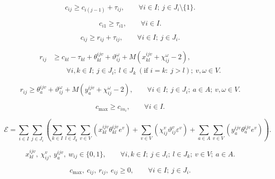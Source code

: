 \documentclass[11pt]{article}
\begin{document}
\begin{equation}
c_{ij} \ge c_{i(j-1)} + \tau_{ij},
\qquad \forall i \in I;\ j \in J_i\setminus\{1\}.
\tag{B7}
\end{equation}

\begin{equation}
c_{i1} \ge \tau_{i1},
\qquad \forall i \in I.
\tag{B8}
\end{equation}

\begin{equation}
c_{ij} \ge r_{ij} + \tau_{ij},
\qquad \forall i \in I;\ j \in J_i.
\tag{B9}
\end{equation}

\begin{equation}
\begin{aligned}
r_{ij}
&\ge
c_{kl}-\tau_{kl}
+
\theta_{kl}^{ijv}
+
\vartheta_{ij}^{\omega}
+
M\left(x_{kl}^{ijv}+\chi_{ij}^{\omega}-2\right),\\
&\qquad
\forall i,k \in I;\ j \in J_i;\ l \in J_k\ ( \text{if } i=k:\ j>l );
\ v,\omega \in V.
\end{aligned}
\tag{B10}
\end{equation}

\begin{equation}
r_{ij}
\ge
\theta_a^{ijv}
+
\vartheta_{ij}^{\omega}
+
M\left(y_a^{ijv}+\chi_{ij}^{\omega}-2\right),
\qquad
\forall i \in I;\ j \in J_i;\ a \in A;\ v,\omega \in V.
\tag{B11}
\end{equation}

\begin{equation}
c_{\max} \ge c_{in_i},
\qquad \forall i \in I.
\tag{B12}
\end{equation}

\begin{equation}
\mathcal{E}
=
\sum_{i\in I}\sum_{j\in J_i}
\left(
    \sum_{k\in I}\sum_{l\in J_k}\sum_{v\in V}
        \left(x_{kl}^{ijv}\theta_{kl}^{ijv}e^{v}\right)
    +
    \sum_{v\in V}
        \left(\chi_{ij}^{v}\vartheta_{ij}^{v}\varepsilon^{v}\right)
    +
    \sum_{a\in A}\sum_{v\in V}
        \left(y_a^{ijv}\theta_a^{ijv}e^{v}\right)
\right).
\tag{B13}
\end{equation}

\begin{equation}
x_{kl}^{ijv},\ \chi_{ij}^{v},\ y_a^{ijv},\ w_{ij} \in \{0,1\},
\qquad
\forall i,k \in I;\ j \in J_i;\ l \in J_k;\ v \in V;\ a \in A.
\tag{B14}
\end{equation}

\begin{equation}
c_{\max},\ c_{ij},\ r_{ij},\ e_{ij} \ge 0,
\qquad \forall i \in I;\ j \in J_i.
\tag{B15}
\end{equation}
\end{document}
